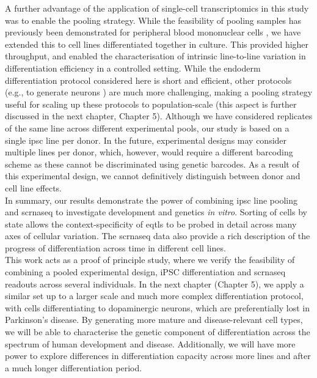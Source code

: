 A further advantage of the application of single-cell transcriptomics in this study was to enable the pooling strategy. 
While the feasibility of pooling samples has previously been demonstrated for peripheral blood mononuclear cells \cite{kang2018multiplexed}, we have extended this to cell lines differentiated together in culture. 
This provided higher throughput, and enabled the characterisation of intrinsic line-to-line variation in differentiation efficiency in a controlled setting. 
While the endoderm differentiation protocol considered here is short and efficient, other protocols (e.g., to generate neurons \cite{tao2016neural}) are much more challenging, making a pooling strategy useful for scaling up these protocols to population-scale (this aspect is further discussed in the next chapter, Chapter 
5).
Although we have considered replicates of the same line across different experimental pools, our study is based on a single \gls{ipsc} line per donor. 
In the future, experimental designs may consider multiple lines per donor, which, however, would require a different barcoding scheme as these cannot be discriminated
using genetic barcodes. 
As a result of this experimental design, we cannot definitively distinguish between donor and cell line effects.\\

In summary, our results demonstrate the power of combining \gls{ipsc} line pooling and \gls{scrnaseq} to investigate development and genetics \textit{in vitro}. 
Sorting of cells by state allows the context-specificity of \glspl{eqtl} to be probed in detail across many axes of cellular variation. 
The \gls{scrnaseq} data also provide a rich description of the progress of differentiation across time in different cell lines. \\

This work acts as a proof of principle study, where we verify the feasibility of combining a pooled experimental design, iPSC differentiation and \gls{scrnaseq} readouts across several individuals.
In the next chapter (Chapter 
5), we apply a similar set up to a larger scale and much more complex differentiation protocol, with cells differentiating to dopaminergic neurons, which are preferentially lost in Parkinson's disease.
By generating more mature and disease-relevant cell types, we will be able to characterise the genetic component of differentiation across the spectrum of human development and disease.
Additionally, we will have more power to explore differences in differentiation capacity across more lines and after a much longer differentiation period.

